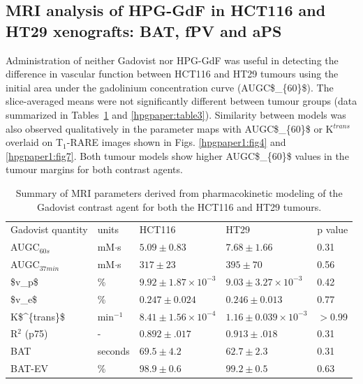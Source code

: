\subsection{MRI analysis of \acs{HPG-GdF} in HCT116 and HT29 xenografts: \acs{BAT}, \acs{fPV} and \acs{aPS}}

Administration of neither Gadovist nor \acs{HPG-GdF} was useful in detecting the difference in vascular function between HCT116 and HT29 tumours using the initial area under the gadolinium concentration curve (\acs{AUGC$_{60}$}).
The slice-averaged means were not significantly different between tumour groups (data summarized in Tables~\ref{hpgpaper:table2} and \ref{hpgpaper:table3}).
Similarity between models was also observed qualitatively in the parameter maps with \acs{AUGC$_{60}$} or K$^{trans}$ overlaid on T$_1$-RARE images shown in Figs.
\ref{hpgpaper1:fig4} and \ref{hpgpaper1:fig7}.
Both tumour models show higher \acs{AUGC$_{60}$} values in the tumour margins for both contrast agents.

\begin{table}[htbp]
\begin{tabular}{@{}lllll@{}}
    \rowcolor{gray!50}
Gadovist quantity  & units     & HCT116         & HT29           & p value \\ %
AUGC$_{60s}$  & mM$\cdot$s      & $5.09\pm0.83$      & $7.68\pm1.66$      & 0.31 \\
AUGC$_{37min}$ & mM$\cdot$s      & $317\pm23$         & $395\pm70$         & 0.56 \\
\acs{$v_p$}          & \% & $9.92\pm1.87\times10^{-3}$ & $9.03\pm3.27\times10^{-3}$ & 0.42    \\
\acs{$v_e$}          & \% & $0.247\pm0.024$    & $0.246\pm0.013$    & 0.77    \\
\acs{K$^{trans}$}  & min$^{-1}$     & $8.41\pm1.56\times10^{-4}$  & $1.16\pm0.039\times10^{-3}$ & $>$0.99   \\
R$^2$ (p75)    &    -       & $0.892\pm.017$     & $0.913\pm.018$     & 0.31    \\
BAT         & seconds   & $69.5\pm4.2$       & $62.7\pm2.3$       & 0.31    \\
BAT-EV      & \%         & $98.9\pm0.6$       & $99.2\pm0.5$       & 0.63    \\ 
\end{tabular}
\caption{Summary of MRI parameters derived from pharmacokinetic modeling of the Gadovist contrast agent for both the HCT116 and HT29 tumours.}
\label{hpgpaper:table2}
\end{table}

